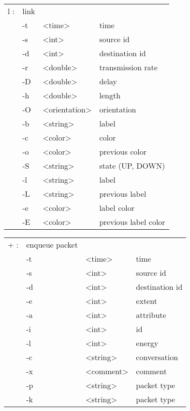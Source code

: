   \begin{tabular}{llll}
  l : & link & & \\
    &  -t & <time> & time \\
    &  -s & <int> & source id \\
    &  -d & <int> & destination id \\
    &  -r & <double> & transmission rate \\
    &  -D & <double> & delay \\
    &  -h & <double> & length \\
    &  -O & <orientation> & orientation \\
    &  -b & <string> & label \\
    &  -c & <color> & color \\
    &  -o & <color> & previous color \\
    &  -S & <string> & state (UP, DOWN) \\
    &  -l & <string> & label \\
    &  -L & <string> & previous label \\
    &  -e & <color> & label color \\
    &  -E & <color> & previous label color \\
  \end{tabular}

  \begin{tabular}{llll}
  + : & enqueue packet & & \\
    &  -t & <time> & time \\
    &  -s & <int> & source id \\
    &  -d & <int> & destination id \\
    &  -e & <int> & extent \\
    &  -a & <int> & attribute \\
    &  -i & <int> & id \\
    &  -l & <int> & energy \\
    &  -c & <string> & conversation \\
    &  -x & <comment> & comment \\
    &  -p & <string> & packet type \\
    &  -k & <string> & packet type \\
  \end{tabular}

